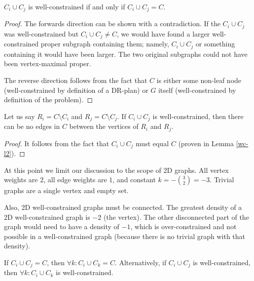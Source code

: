 \documentclass[11pt]{article}
\newcommand{\todo}[1]{\textsc{{\color{red}#1}}}
\begin{document}
\begin{lemma}\label{wc-l2}
$C_i\cup C_j$ is well-constrained if and only if $C_i\cup C_j = C$.
\end{lemma}

\begin{proof}
The forwards direction can be shown with a contradiction. If the $C_i\cup C_j$ was well-constrained but $C_i\cup C_j \neq C$, we would have found a larger well-constrained proper subgraph containing them; namely, $C_i\cup C_j$ or something containing it would have been larger. The two original subgraphs could not have been vertex-maximal proper.

The reverse direction follows from the fact that $C$ is either some non-leaf node (well-constrained by definition of a DR-plan) or $G$ itself (well-constrained by definition of the problem).
\end{proof}

\begin{corollary}\label{wc-c1}
Let us say $R_i=C\setminus C_i$ and $R_j=C\setminus C_j$. If $C_i\cup C_j$ is well-constrained, then there can be no edges in $C$ between the vertices of $R_i$ and $R_j$.
\end{corollary}

\begin{proof}
It follows from the fact that $C_i\cup C_j$ must equal $C$ (proven in Lemma \ref{wc-l2}).
\end{proof}



At this point we limit our discussion to the scope of 2D graphs. All vertex weights are $2$, all edge weights are $1$, and constant $k= -{{3}\choose{2}}=-3$. Trivial graphs are a single vertex and empty set.

Also, 2D well-constrained graphs must be connected.
The greatest density of a 2D well-constrained graph is $-2$ (the vertex). The other disconnected part of the graph would need to have a density of $-1$, which is over-constrained and not possible in a well-constrained graph (because there is no trivial graph with that density).

\begin{lemma}\label{wc-l3}
If $C_i\cup C_j=C$, then $\forall k: C_i\cup C_k=C$.
Alternatively, if $C_i\cup C_j$ is well-constrained, then $\forall k: C_i\cup C_k$ is well-constrained.
\end{lemma}
\end{document}
